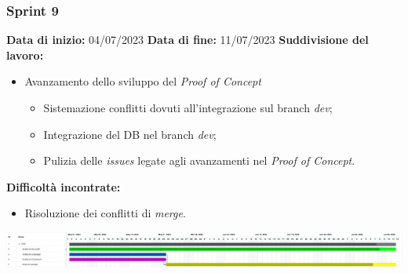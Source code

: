 \documentclass[a4paper, 12pt]{article}
\begin{document}
\newpage

\subsubsection{Sprint 9}
\textbf{Data di inizio:} 04/07/2023\newline
\textbf{Data di fine:} 11/07/2023\newline
\newline
\textbf{Suddivisione del lavoro:}
\begin{itemize}
    \item Avanzamento dello sviluppo del \textit{Proof of Concept}
    \begin{itemize}
        \item Sistemazione conflitti dovuti all'integrazione sul branch \textit{dev};
        \item Integrazione del DB nel branch \textit{dev};
        \item Pulizia delle \textit{issues} legate agli avanzamenti nel \textit{Proof of Concept}.
    \end{itemize}
\end{itemize}
\textbf{Difficoltà incontrate:}
\begin{itemize}
    \item Risoluzione dei conflitti di \textit{merge}.
\end{itemize}
\includegraphics[scale=0.176]{RTB_8.png}\newline
\newline
\end{document}
